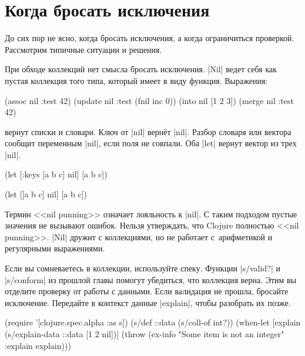 \section{Когда бросать исключения}

До сих пор не ясно, когда бросать исключения, а когда ограничиться
проверкой. Рассмотрим типичные ситуации и решения.

При обходе коллекций нет смысла бросать исключения. \spverb|Nil| ведет себя как
пустая коллекция того типа, который имеет в виду функция. Выражения:

\begin{english}
  \begin{clojure}
(assoc nil :test 42)
(update nil :test (fnil inc 0))
(into nil [1 2 3])
(merge nil {:test 42})
  \end{clojure}
\end{english}

\noindent
вернут списки и словари. Ключ от \spverb|nil| верн\"{е}т \spverb|nil|. Разбор
словаря или вектора сообщит переменным \spverb|nil|, если поля не совпали. Оба
\spverb|let| вернут вектор из трех \spverb|nil|.

\begin{english}
  \begin{clojure}
(let [{:keys [a b c]} nil]
  [a b c])

(let [[a b c] nil]
  [a b c])
  \end{clojure}
\end{english}

\noindent


Термин <<nil punning>> означает лояльность к \spverb|nil|. С таким подходом
пустые значения не вызывают ошибок. Нельзя утверждать, что Clojure полностью
<<nil punning>>. \spverb|Nil| дружит с коллекциями, но не работает с~арифметикой
и регулярными выражениями.

Если вы сомневаетесь в коллекции, используйте спеку. Функции \spverb|s/valid?| и
\spverb|s/conform| из прошлой главы  помогут убедиться, что
коллекция верна. Этим вы отделите проверку от работы с данными. Если валидация
не прошла, бросайте исключение. Передайте в контекст данные \spverb|explain|,
чтобы разобрать их позже.

\begin{english}
  \begin{clojure}
(require '[clojure.spec.alpha :as s])
(s/def ::data (s/coll-of int?))
(when-let [explain (s/explain-data ::data [1 2 nil])]
  (throw (ex-info "Some item is not an integer"
                  {:explain explain})))
  \end{clojure}
\end{english}

